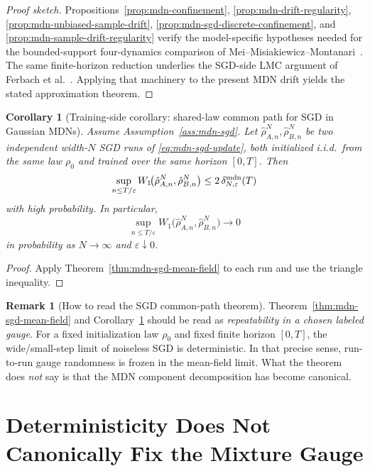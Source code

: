 \documentclass[11pt]{article}
\newtheorem{corollary}[theorem]{Corollary}
\theoremstyle{definition}
\newtheorem{remark}[theorem]{Remark}
\begin{document}
\begin{proof}[Proof sketch]
Propositions~\ref{prop:mdn-confinement}, \ref{prop:mdn-drift-regularity},
\ref{prop:mdn-unbiased-sample-drift},
\ref{prop:mdn-sgd-discrete-confinement}, and
\ref{prop:mdn-sample-drift-regularity} verify the model-specific hypotheses
needed for the bounded-support four-dynamics comparison of
Mei--Misiakiewicz--Montanari~\cite{MeiMisiakiewiczMontanari2019}. The same
finite-horizon reduction underlies the SGD-side LMC argument of
Ferbach et al.~\cite{FerbachEtAl2024}. Applying that machinery to the present
MDN drift yields the stated approximation theorem.
\end{proof}

\begin{corollary}[Training-side corollary: shared-law common path for SGD in Gaussian MDNs]
\label{cor:mdn-sgd-common-path}
Assume Assumption~\ref{ass:mdn-sgd}. Let $\hat\rho_{A,n}^N,\hat\rho_{B,n}^N$ be
two independent width-$N$ SGD runs of \eqref{eq:mdn-sgd-update}, both
initialized i.i.d.\ from the same law $\rho_0$ and trained over the same
horizon $[0,T]$. Then
\[
  \sup_{n\le T/\varepsilon}
  W_1\!\bigl(\hat\rho_{A,n}^N,\hat\rho_{B,n}^N\bigr)
  \le
  2\,\delta_{N,\varepsilon}^{\rm mdn}(T)
\]
with high probability. In particular,
\[
  \sup_{n\le T/\varepsilon}
  W_1\!\bigl(\hat\rho_{A,n}^N,\hat\rho_{B,n}^N\bigr)\to 0
\]
in probability as $N\to\infty$ and $\varepsilon\downarrow 0$.
\end{corollary}

\begin{proof}
Apply Theorem~\ref{thm:mdn-sgd-mean-field} to each run and use the triangle
inequality.
\end{proof}

\begin{remark}[How to read the SGD common-path theorem]
Theorem~\ref{thm:mdn-sgd-mean-field} and
Corollary~\ref{cor:mdn-sgd-common-path} should be read as \emph{repeatability in
a chosen labeled gauge}. For a fixed initialization law $\rho_0$ and fixed
finite horizon $[0,T]$, the wide/small-step limit of noiseless SGD is
deterministic. In that precise sense, run-to-run gauge randomness is frozen in
the mean-field limit. What the theorem does \emph{not} say is that the MDN
component decomposition has become canonical.
\end{remark}

\section{Deterministicity Does Not Canonically Fix the Mixture Gauge}
\end{document}
